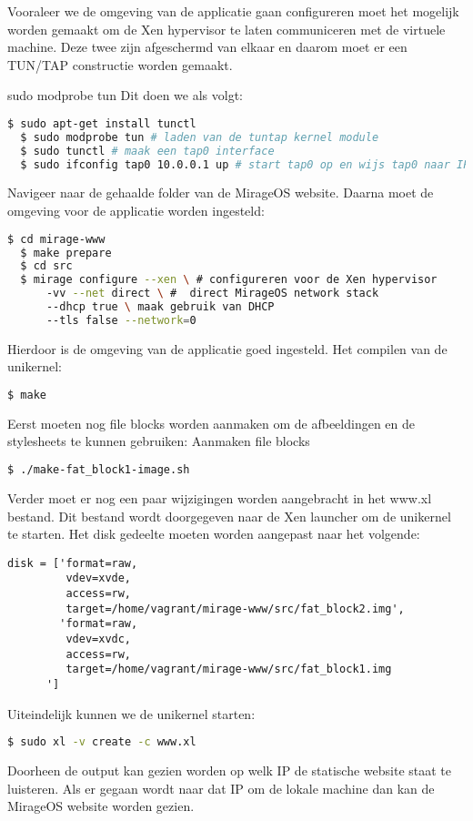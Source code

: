 Vooraleer we de omgeving van de applicatie gaan configureren moet het mogelijk worden gemaakt om de Xen hypervisor te laten communiceren met de virtuele machine. Deze twee zijn afgeschermd van elkaar en daarom moet er een TUN/TAP constructie worden gemaakt. 

sudo modprobe tun
\noindent Dit doen we als volgt:
\begin{lstlisting}[language=bash]
  $ sudo apt-get install tunctl
  $ sudo modprobe tun # laden van de tuntap kernel module
  $ sudo tunctl # maak een tap0 interface
  $ sudo ifconfig tap0 10.0.0.1 up # start tap0 op en wijs tap0 naar IP
\end{lstlisting}

Navigeer naar de gehaalde folder van de MirageOS website. 
\noindent Daarna moet de omgeving voor de applicatie worden ingesteld:
\begin{lstlisting}[language=bash]
  $ cd mirage-www
  $ make prepare
  $ cd src
  $ mirage configure --xen \ # configureren voor de Xen hypervisor
      -vv --net direct \ #  direct MirageOS network stack
      --dhcp true \ maak gebruik van DHCP
      --tls false --network=0
\end{lstlisting}

Hierdoor is de omgeving van de applicatie goed ingesteld.
\noindent Het compilen van de unikernel:
\begin{lstlisting}[language=bash]
  $ make
\end{lstlisting}

Eerst moeten nog file blocks worden aanmaken om de afbeeldingen en de stylesheets te kunnen gebruiken:
\noindent Aanmaken file blocks
\begin{lstlisting}[language=bash]
  $ ./make-fat_block1-image.sh
\end{lstlisting}

Verder moet er nog een paar wijzigingen worden aangebracht in het www.xl bestand. Dit bestand wordt doorgegeven naar de Xen launcher om de unikernel te starten.
\noindent Het disk gedeelte moeten worden aangepast naar het volgende:
\begin{lstlisting}
disk = ['format=raw,
         vdev=xvde,
         access=rw,
         target=/home/vagrant/mirage-www/src/fat_block2.img',
        'format=raw,
         vdev=xvdc,
         access=rw,
         target=/home/vagrant/mirage-www/src/fat_block1.img
      ']
\end{lstlisting}


\noindent Uiteindelijk kunnen we de unikernel starten:
\begin{lstlisting}[language=bash]
  $ sudo xl -v create -c www.xl
\end{lstlisting}

Doorheen de output kan gezien worden op welk IP de statische website staat te luisteren. Als er gegaan wordt naar dat IP om de lokale machine dan kan de MirageOS website worden gezien.
